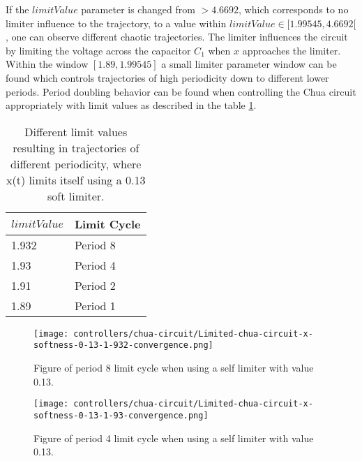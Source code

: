 \documentclass[main]{subfiles}
\begin{document}
If the $limitValue$ parameter is changed from \(>4.6692\), which corresponds to no limiter influence to the trajectory, to a value within \(limitValue \in [1.99545,4.6692[\), one can observe different chaotic trajectories. The limiter influences the circuit by limiting the voltage across the capacitor \(C_1\) when \(x\) approaches the limiter. %
%
Within the window \([1.89,1.99545]\) a small limiter parameter window can be found which controls trajectories of high periodicity down to different lower periods. %
%
Period doubling behavior can be found when controlling the Chua circuit appropriately with limit values as described in the table \ref{table:x-0.13-periodicities}.

\begin{table}[H]
\renewcommand{\arraystretch}{1.2}
\center
\begin{tabular}{@{}ll@{}}
	\toprule
   \(limitValue\) & Limit Cycle\\
   \midrule
   1.932 & Period 8 \\ 
   1.93 & Period 4 \\
   1.91  & Period 2 \\
   1.89 & Period 1 \\
   \bottomrule
\end{tabular}
\caption[Limiter values for periodic trajectories for for an x self-limiting limiter with softness 0.13]{Different limit values resulting in trajectories of different periodicity, where x(t) limits itself using a 0.13 soft limiter.}
\label{table:x-0.13-periodicities}
\end{table}

\begin{figure}[H]
\centering
\texttt{[image: controllers/chua-circuit/Limited-chua-circuit-x-softness-0-13-1-932-convergence.png]}
\caption[Figure of period 8 limit cycle using self limiting 0.13 soft limiter]{Figure of period 8 limit cycle when using a self limiter with value 0.13.}
\label{figure:x-0.13-8-limit-cycle-trajectory}
\end{figure}

\begin{figure}[H]
\centering
\texttt{[image: controllers/chua-circuit/Limited-chua-circuit-x-softness-0-13-1-93-convergence.png]}
\caption[Figure of period 4 limit cycle using self limiter 0.13 soft limiter]{Figure of period 4 limit cycle when using a self limiter with value 0.13.}
\label{figure:x-0.13-4-limit-cycle-trajectory}
\end{figure}
\end{document}
